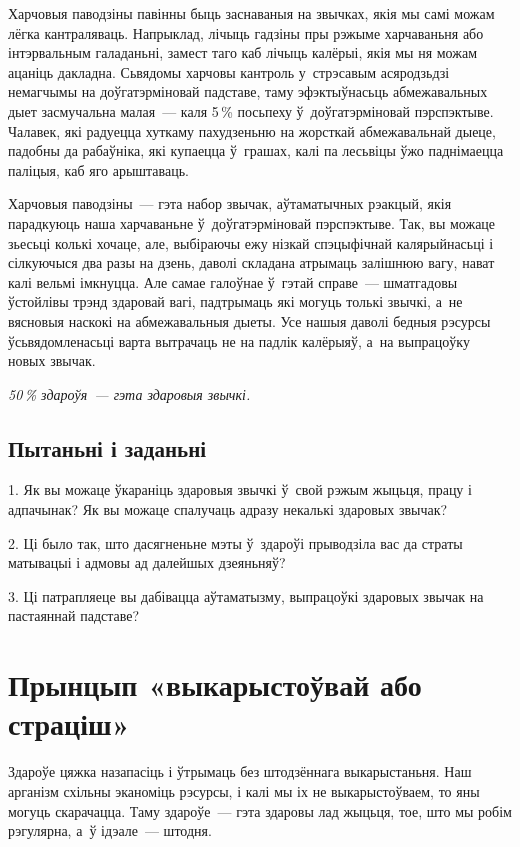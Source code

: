 Харчовыя паводзіны павінны быць заснаваныя на звычках, якія мы самі можам лёгка кантраляваць. Напрыклад, лічыць гадзіны пры рэжыме харчаваньня або інтэрвальным галаданьні, замест таго каб лічыць калёрыі, якія мы ня можам ацаніць дакладна. Сьвядомы харчовы кантроль у~стрэсавым асяродзьдзі немагчымы на доўгатэрміновай падставе, таму эфэктыўнасьць абмежавальных дыет засмучальна малая~--- каля 5\,\% посьпеху ў~доўгатэрміновай пэрспэктыве. Чалавек, які радуецца хуткаму пахудзеньню на жорсткай абмежавальнай дыеце, падобны да рабаўніка, які купаецца ў~грашах, калі па лесьвіцы ўжо паднімаецца паліцыя, каб яго арыштаваць.

Харчовыя паводзіны~--- гэта набор звычак, аўтаматычных рэакцый, якія парадкуюць наша харчаваньне ў~доўгатэрміновай пэрспэктыве. Так, вы можаце зьесьці колькі хочаце, але, выбіраючы ежу нізкай спэцыфічнай калярыйнасьці і сілкуючыся два разы на дзень, даволі складана атрымаць залішнюю вагу, нават калі вельмі імкнуцца. Але самае галоўнае ў~гэтай справе~--- шматгадовы ўстойлівы трэнд здаровай вагі, падтрымаць які могуць толькі звычкі, а~не вясновыя наскокі на абмежавальныя дыеты. Усе нашыя даволі бедныя рэсурсы ўсьвядомленасьці варта вытрачаць не на падлік калёрыяў, а~на выпрацоўку новых звычак. 

\emph{50\,\% здароўя~--- гэта здаровыя звычкі.}

\subsection*{Пытаньні і заданьні}

1. Як вы можаце ўкараніць здаровыя звычкі ў~свой рэжым жыцьця, працу і адпачынак? Як вы можаце спалучаць адразу некалькі здаровых звычак?

2. Ці было так, што дасягненьне мэты ў~здароўі прыводзіла вас да страты матывацыі і адмовы ад далейшых дзеяньняў?

3. Ці патрапляеце вы дабівацца аўтаматызму, выпрацоўкі здаровых звычак на пастаяннай падставе?


\section{Прынцып «выкарыстоўвай або страціш»}

Здароўе цяжка назапасіць і ўтрымаць без штодзённага выкарыстаньня. Наш арганізм схільны эканоміць рэсурсы, і калі мы іх не выкарыстоўваем, то яны могуць скарачацца. Таму здароўе~--- гэта здаровы лад жыцьця, тое, што мы робім рэгулярна, а~ў ідэале~--- штодня.

